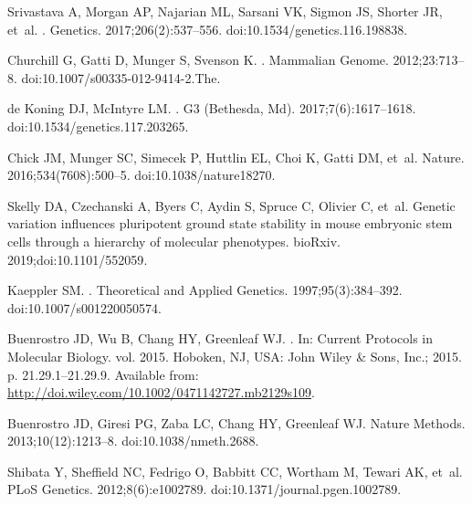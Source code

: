 \documentclass[10pt,letterpaper]{article}
\begin{document}
\begin{thebibliography}{10}
Srivastava A, Morgan AP, Najarian ML, Sarsani VK, Sigmon JS, Shorter JR, et~al.
.
\newblock Genetics. 2017;206(2):537--556.
\newblock doi:{10.1534/genetics.116.198838}.

Churchill G, Gatti D, Munger S, Svenson K.
.
\newblock Mammalian Genome. 2012;23:713--8.
\newblock doi:{10.1007/s00335-012-9414-2.The}.

de Koning DJ, McIntyre LM.
.
\newblock G3 (Bethesda, Md). 2017;7(6):1617--1618.
\newblock doi:{10.1534/genetics.117.203265}.

Chick JM, Munger SC, Simecek P, Huttlin EL, Choi K, Gatti DM, et~al.
\newblock Nature. 2016;534(7608):500--5.
\newblock doi:{10.1038/nature18270}.

Skelly DA, Czechanski A, Byers C, Aydin S, Spruce C, Olivier C, et~al.
\newblock Genetic variation influences pluripotent ground state stability in
  mouse embryonic stem cells through a hierarchy of molecular phenotypes.
\newblock bioRxiv. 2019;doi:{10.1101/552059}.

Kaeppler SM.
.
\newblock Theoretical and Applied Genetics. 1997;95(3):384--392.
\newblock doi:{10.1007/s001220050574}.

Buenrostro JD, Wu B, Chang HY, Greenleaf WJ.
.
\newblock In: Current Protocols in Molecular Biology. vol. 2015. Hoboken, NJ,
  USA: John Wiley {\&} Sons, Inc.; 2015. p. 21.29.1--21.29.9.
\newblock Available from:
  \url{http://doi.wiley.com/10.1002/0471142727.mb2129s109}.

Buenrostro JD, Giresi PG, Zaba LC, Chang HY, Greenleaf WJ.
\newblock Nature Methods. 2013;10(12):1213--8.
\newblock doi:{10.1038/nmeth.2688}.

Shibata Y, Sheffield NC, Fedrigo O, Babbitt CC, Wortham M, Tewari AK, et~al.
\newblock PLoS Genetics. 2012;8(6):e1002789.
\newblock doi:{10.1371/journal.pgen.1002789}.


\end{thebibliography}
\end{document}
